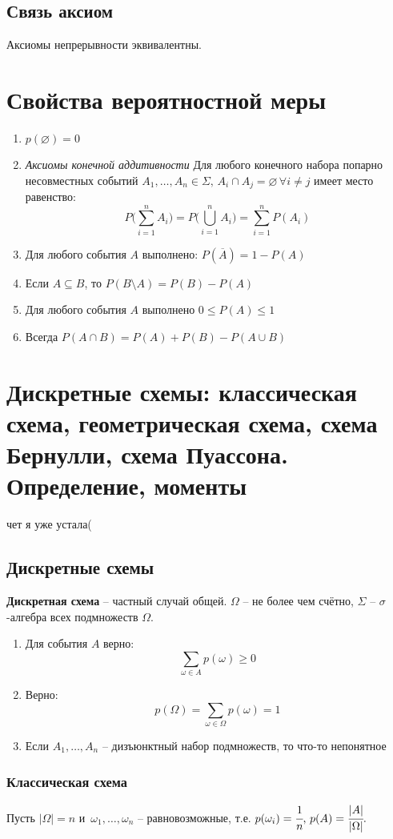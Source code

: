 \documentclass{article}
\begin{document}
\subsection{Связь аксиом}
Аксиомы непрерывности эквивалентны.
\newpage
\section{Свойства вероятностной меры}
\begin{enumerate}
    \item $p(\varnothing)=0$
    \item \textit{Аксиомы конечной аддитивности}  Для любого конечного набора попарно несовместных событий $A_1,\dots,A_n\in\Sigma,\,A_i\cap A_j=\varnothing\,\forall i\neq j$ имеет место равенство:
    $$ P\Big(\sum^n_{i=1}A_i\Big)=P\Big(\bigcup^n_{i=1}A_i\Big)=\sum^n_{i=1}P(A_i) $$
    \item Для любого события $A$ выполнено: $P(\overline{A})=1-P(A)$
    \item Если $A\subseteq B$, то $P(B\setminus A)=P(B)-P(A)$
    \item Для любого события $A$ выполнено $0\leq P(A)\leq 1$
    \item Всегда $P(A\cap B)=P(A)+P(B)-P(A\cup B)$
\end{enumerate}
\newpage
\section{Дискретные схемы: классическая схема, геометрическая схема, схема Бернулли, схема Пуассона. Определение, моменты}
чет я уже устала(
\subsection{Дискретные схемы}
\textbf{Дискретная схема} -- частный случай общей. $\Omega$ -- не более чем счётно, $\Sigma$ -- $\sigma$-алгебра всех подмножеств $\Omega$.
\begin{enumerate}
    \item Для события $A$ верно: $$ \sum_{\omega\in A}p(\omega)\geq 0 $$
    \item Верно: $$ p(\Omega)=\sum_{\omega\in\Omega}p(\omega)=1 $$
    \item Если $A_1,\dots,A_n$ -- дизъюнктный набор подмножеств, то что-то непонятное
\end{enumerate}
\subsubsection{Классическая схема}
Пусть $|\Omega|=n$ и $\,\omega_1,\dots,\omega_n$ -- равновозможные, т.е. $p(\omega_i)=\cfrac{1}{n},\,p(A)=\cfrac{|A|}{|\Omega|}.$ 
\end{document}
